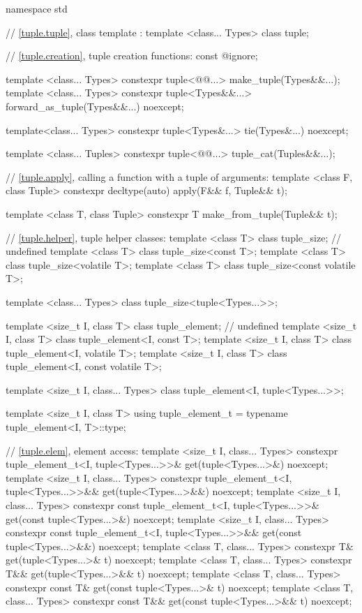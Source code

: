 %
\begin{codeblock}
namespace std {
  // \ref{tuple.tuple}, class template :
  template <class... Types> class tuple;

  // \ref{tuple.creation}, tuple creation functions:
  const @\unspec@ ignore;

  template <class... Types>
    constexpr tuple<@@...> make_tuple(Types&&...);
  template <class... Types>
    constexpr tuple<Types&&...> forward_as_tuple(Types&&...) noexcept;

  template<class... Types>
    constexpr tuple<Types&...> tie(Types&...) noexcept;

  template <class... Tuples>
    constexpr tuple<@@...> tuple_cat(Tuples&&...);

  // \ref{tuple.apply}, calling a function with a tuple of arguments:
  template <class F, class Tuple>
    constexpr decltype(auto) apply(F&& f, Tuple&& t);

  template <class T, class Tuple>
    constexpr T make_from_tuple(Tuple&& t);

  // \ref{tuple.helper}, tuple helper classes:
  template <class T> class tuple_size;  // undefined
  template <class T> class tuple_size<const T>;
  template <class T> class tuple_size<volatile T>;
  template <class T> class tuple_size<const volatile T>;

  template <class... Types> class tuple_size<tuple<Types...>>;

  template <size_t I, class T> class tuple_element;    // undefined
  template <size_t I, class T> class tuple_element<I, const T>;
  template <size_t I, class T> class tuple_element<I, volatile T>;
  template <size_t I, class T> class tuple_element<I, const volatile T>;

  template <size_t I, class... Types> class tuple_element<I, tuple<Types...>>;

  template <size_t I, class T>
    using tuple_element_t = typename tuple_element<I, T>::type;

  // \ref{tuple.elem}, element access:
  template <size_t I, class... Types>
    constexpr tuple_element_t<I, tuple<Types...>>&
      get(tuple<Types...>&) noexcept;
  template <size_t I, class... Types>
    constexpr tuple_element_t<I, tuple<Types...>>&&
      get(tuple<Types...>&&) noexcept;
  template <size_t I, class... Types>
    constexpr const tuple_element_t<I, tuple<Types...>>&
      get(const tuple<Types...>&) noexcept;
  template <size_t I, class... Types>
    constexpr const tuple_element_t<I, tuple<Types...>>&&
      get(const tuple<Types...>&&) noexcept;
  template <class T, class... Types>
    constexpr T& get(tuple<Types...>& t) noexcept;
  template <class T, class... Types>
    constexpr T&& get(tuple<Types...>&& t) noexcept;
  template <class T, class... Types>
    constexpr const T& get(const tuple<Types...>& t) noexcept;
  template <class T, class... Types>
    constexpr const T&& get(const tuple<Types...>&& t) noexcept;

}
\end{codeblock}
